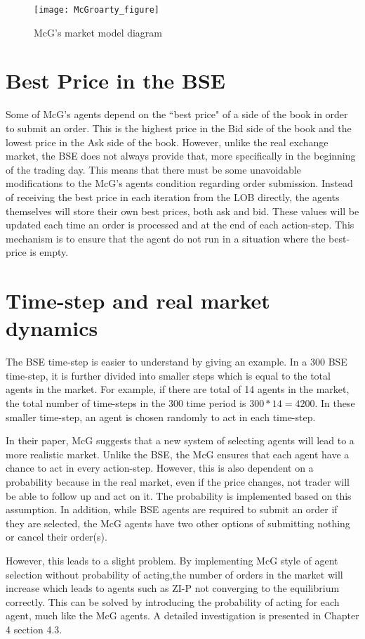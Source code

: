 \begin{figure}[h]
\texttt{[image: McGroarty\_figure]}
\caption{McG's market model diagram} 
\end{figure} 
\FloatBarrier

\section{Best Price in the BSE}
Some of McG's agents depend on the ``best price" of a side of the book in order to submit an order. This is the highest price in the Bid side of the book and the lowest price in the Ask side of the book. However, unlike the real exchange market, the BSE does not always provide that, more specifically in the beginning of the trading day. This means that there must be some unavoidable modifications to the McG's agents condition regarding order submission. Instead of receiving the best price in each iteration from the LOB directly, the agents themselves will store their own best prices, both ask and bid. These values will be updated each time an order is processed and at the end of each action-step. This mechanism is to ensure that the agent do not run in a situation where the best-price is empty.

\section{Time-step and real market dynamics}
The BSE time-step is easier to understand by giving an example. In a 300 BSE time-step, it is further divided into smaller steps which is equal to the total agents in the market. For example, if there are total of 14 agents in the market, the total number of time-steps in the 300 time period is $300 * 14 = 4200$. In these smaller time-step, an agent is chosen randomly to act in each time-step. 

In their paper, McG suggests that a new system of selecting agents will lead to a more realistic market. Unlike the BSE, the McG ensures that each agent have a chance to act in every action-step. However, this is also dependent on a probability because in the real market, even if the price changes, not trader will be able to follow up and act on it. The probability is implemented based on this assumption. In addition, while BSE agents are required to submit an order if they are selected, the McG agents have two other options of submitting nothing or cancel their order(s). 

However, this leads to a slight problem. By implementing McG style of agent selection without probability of acting,the number of orders in the market will increase which leads to agents such as ZI-P not converging to the equilibrium correctly. This can be solved by introducing the probability of acting for each agent, much like the McG agents. A detailed investigation is presented in Chapter 4 section 4.3. 

